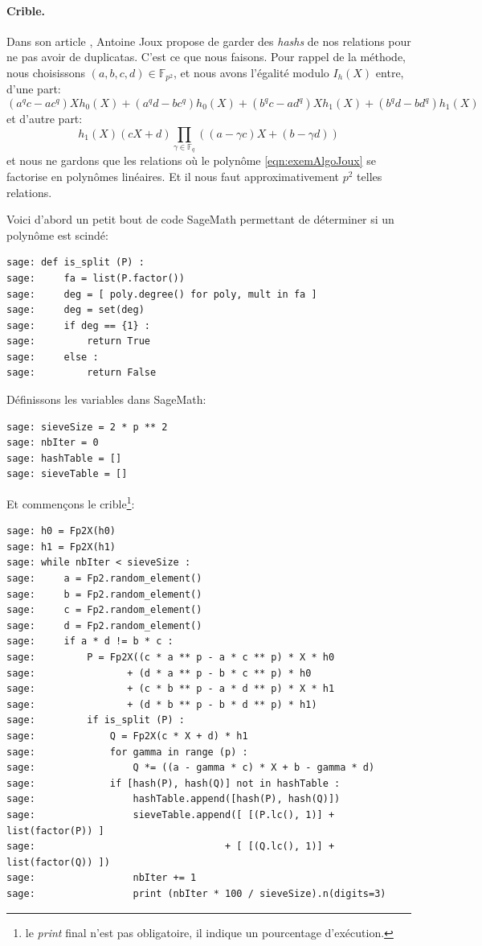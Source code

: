 \documentclass[a4paper, titlepage, 11pt]{article}
\theoremstyle{definition}
\theoremstyle{remark}
\def\gf #1{\mathbb{F}_{#1}}
\begin{document}
\paragraph{Crible.}Dans son article \cite{joux2013}, Antoine Joux propose de garder des \textit{hashs} de nos relations pour ne pas avoir de duplicatas. C'est ce que nous faisons. Pour rappel de la méthode, nous choisissons $(a,b,c,d) \in \gf{p^2}$, et nous avons l'égalité modulo $I_h(X)$ entre, d'une part:
\begin{equation}\label{eqn:exemAlgoJoux}
(a^qc - ac^q)Xh_0(X) + (a^qd - bc^q)h_0(X) + (b^qc - ad^q)Xh_1(X) + (b^qd - bd^q)h_1(X)
\end{equation}
et d'autre part:
$$h_1(X)(cX+d) \prod_{\gamma\in\gf{q}}((a-\gamma c)X + (b-\gamma d))$$
et nous ne gardons que les relations où le polynôme \ref{eqn:exemAlgoJoux} se factorise en polynômes linéaires. Et il nous faut approximativement $p^2$ telles relations.

Voici d'abord un petit bout de code SageMath permettant de déterminer si un polynôme est scindé:
\begin{verbatim}
sage: def is_split (P) :
sage:     fa = list(P.factor())
sage:     deg = [ poly.degree() for poly, mult in fa ]
sage:     deg = set(deg)
sage:     if deg == {1} :
sage:         return True
sage:     else :
sage:         return False
\end{verbatim}
Définissons les variables dans SageMath:
\begin{verbatim}
sage: sieveSize = 2 * p ** 2
sage: nbIter = 0
sage: hashTable = []
sage: sieveTable = []
\end{verbatim}
Et commençons le crible\footnote{le \textit{print} final n'est pas obligatoire, il indique un pourcentage d'exécution.}:
\begin{verbatim}
sage: h0 = Fp2X(h0)
sage: h1 = Fp2X(h1)
sage: while nbIter < sieveSize :
sage:     a = Fp2.random_element()
sage:     b = Fp2.random_element()
sage:     c = Fp2.random_element()
sage:     d = Fp2.random_element()
sage:     if a * d != b * c :
sage:         P = Fp2X((c * a ** p - a * c ** p) * X * h0
sage:                + (d * a ** p - b * c ** p) * h0
sage:                + (c * b ** p - a * d ** p) * X * h1
sage:                + (d * b ** p - b * d ** p) * h1)
sage:         if is_split (P) :
sage:             Q = Fp2X(c * X + d) * h1
sage:             for gamma in range (p) :
sage:                 Q *= ((a - gamma * c) * X + b - gamma * d)
sage:             if [hash(P), hash(Q)] not in hashTable :
sage:                 hashTable.append([hash(P), hash(Q)])
sage:                 sieveTable.append([ [(P.lc(), 1)] + list(factor(P)) ]
sage:                                 + [ [(Q.lc(), 1)] + list(factor(Q)) ])
sage:                 nbIter += 1
sage:                 print (nbIter * 100 / sieveSize).n(digits=3)
\end{verbatim}
\end{document}
